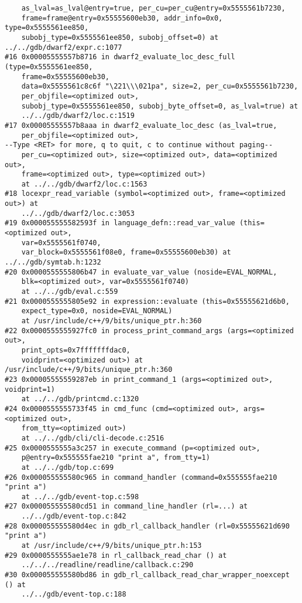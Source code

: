 \documentclass{report}
\begin{document}
\begin{verbatim}
    as_lval=as_lval@entry=true, per_cu=per_cu@entry=0x5555561b7230, 
    frame=frame@entry=0x55555600eb30, addr_info=0x0, type=0x5555561ee850, 
    subobj_type=0x5555561ee850, subobj_offset=0) at ../../gdb/dwarf2/expr.c:1077
#16 0x00005555557b8716 in dwarf2_evaluate_loc_desc_full (type=0x5555561ee850, 
    frame=0x55555600eb30, 
    data=0x5555561c8c6f "\221\\\021pa", size=2, per_cu=0x5555561b7230, 
    per_objfile=<optimized out>, 
    subobj_type=0x5555561ee850, subobj_byte_offset=0, as_lval=true) at 
    ../../gdb/dwarf2/loc.c:1519
#17 0x00005555557b8aaa in dwarf2_evaluate_loc_desc (as_lval=true, 
    per_objfile=<optimized out>, 
--Type <RET> for more, q to quit, c to continue without paging--
    per_cu=<optimized out>, size=<optimized out>, data=<optimized out>, 
    frame=<optimized out>, type=<optimized out>)
    at ../../gdb/dwarf2/loc.c:1563
#18 locexpr_read_variable (symbol=<optimized out>, frame=<optimized out>) at 
    ../../gdb/dwarf2/loc.c:3053
#19 0x000055555582593f in language_defn::read_var_value (this=<optimized out>,
    var=0x5555561f0740, 
    var_block=0x5555561f08e0, frame=0x55555600eb30) at ../../gdb/symtab.h:1232
#20 0x0000555555806b47 in evaluate_var_value (noside=EVAL_NORMAL, 
    blk=<optimized out>, var=0x5555561f0740)
    at ../../gdb/eval.c:559
#21 0x0000555555805e92 in expression::evaluate (this=0x55555621d6b0, 
    expect_type=0x0, noside=EVAL_NORMAL)
    at /usr/include/c++/9/bits/unique_ptr.h:360
#22 0x0000555555927fc0 in process_print_command_args (args=<optimized out>,
    print_opts=0x7fffffffdac0, 
    voidprint=<optimized out>) at /usr/include/c++/9/bits/unique_ptr.h:360
#23 0x00005555559287eb in print_command_1 (args=<optimized out>, voidprint=1)
    at ../../gdb/printcmd.c:1320
#24 0x0000555555733f45 in cmd_func (cmd=<optimized out>, args=<optimized out>,
    from_tty=<optimized out>)
    at ../../gdb/cli/cli-decode.c:2516
#25 0x0000555555a3c257 in execute_command (p=<optimized out>, 
    p@entry=0x555555fae210 "print a", from_tty=1)
    at ../../gdb/top.c:699
#26 0x000055555580c965 in command_handler (command=0x555555fae210 "print a")
    at ../../gdb/event-top.c:598
#27 0x000055555580cd51 in command_line_handler (rl=...) at 
    ../../gdb/event-top.c:842
#28 0x000055555580d4ec in gdb_rl_callback_handler (rl=0x55555621d690 "print a")
    at /usr/include/c++/9/bits/unique_ptr.h:153
#29 0x0000555555ae1e78 in rl_callback_read_char () at 
    ../../../readline/readline/callback.c:290
#30 0x000055555580bd86 in gdb_rl_callback_read_char_wrapper_noexcept () at 
    ../../gdb/event-top.c:188

\end{verbatim}
\end{document}
